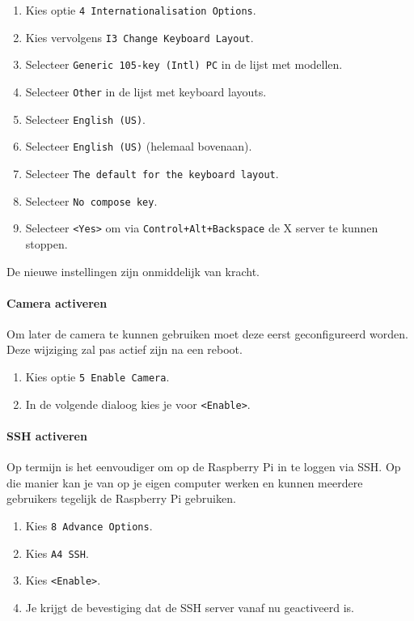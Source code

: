 \documentclass[a4paper]{article}
\begin{document}
      \begin{enumerate}
        \item Kies optie \texttt{4 Internationalisation Options}.
        \item Kies vervolgens \texttt{I3 Change Keyboard Layout}.
        \item Selecteer \texttt{Generic 105-key (Intl) PC} in de lijst met modellen.
        \item Selecteer \texttt{Other} in de lijst met keyboard layouts.
        \item Selecteer \texttt{English (US)}.
        \item Selecteer \texttt{English (US)} (helemaal bovenaan).
        \item Selecteer \texttt{The default for the keyboard layout}.
        \item Selecteer \texttt{No compose key}.
        \item Selecteer \texttt{<Yes>} om via
\texttt{Control+Alt+Backspace} de X server te kunnen stoppen.
      \end{enumerate}

      De nieuwe instellingen zijn onmiddelijk van kracht.

      \paragraph{Camera activeren}
      Om later de camera te kunnen gebruiken moet deze eerst
geconfigureerd worden.  Deze wijziging zal pas actief zijn na een
reboot.

      \begin{enumerate}
        \item Kies optie \texttt{5 Enable Camera}.
        \item In de volgende dialoog kies je voor \texttt{<Enable>}.
      \end{enumerate}

      \paragraph{SSH activeren}
      Op termijn is het eenvoudiger om op de Raspberry Pi in te loggen
via SSH.  Op die manier kan je van op je eigen computer werken en
kunnen meerdere gebruikers tegelijk de Raspberry Pi gebruiken.

      \begin{enumerate}
        \item Kies \texttt{8 Advance Options}.
        \item Kies \texttt{A4 SSH}.
        \item Kies \texttt{<Enable>}.
        \item Je krijgt de bevestiging dat de SSH server vanaf nu
geactiveerd is.
      \end{enumerate}
\end{document}
